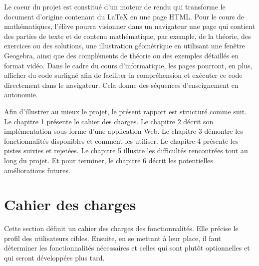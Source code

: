 \documentclass[12pt,titlepage,oneside]{article}
\begin{document}
Le coeur du projet est constitué d'un moteur de rendu qui transforme le document d'origine contenant du LaTeX en une page HTML. Pour le cours de mathématiques, l'élève pourra visionner dans un navigateur une page qui contient des parties de texte et de contenu mathématique, par exemple, de la théorie, des exercices ou des solutions, une illustration géométrique en utilisant une fenêtre Geogebra, ainsi que des compléments de théorie ou des exemples détaillés en format vidéo. Dans le cadre du cours d'informatique, les pages pourront, en plus, afficher du code surligné afin de faciliter la compréhension et exécuter ce code directement dans le navigateur. Cela donne des séquences d'enseignement en autonomie.\par

Afin d’illustrer au mieux le projet, le présent rapport est structuré comme suit. Le chapitre 1 présente le cahier des charges. Le chapitre 2 décrit son implémentation sous forme d'une application Web. Le chapitre 3 démontre les fonctionnalités disponibles et comment les utiliser. Le chapitre 4 présente les pistes suivies et rejetées. Le chapitre 5 illustre les difficultés rencontrées tout au long du projet. Et pour terminer, le chapitre 6 décrit les potentielles améliorations futures.\par


\newpage

\section{Cahier des charges}
Cette section définit un cahier des charges des fonctionnalités. Elle précise le profil des utilisateurs cibles. Ensuite, en se mettant à leur place, il faut déterminer les fonctionnalités nécessaires et celles qui sont plutôt optionnelles et qui seront développées plus tard.\par
\end{document}
